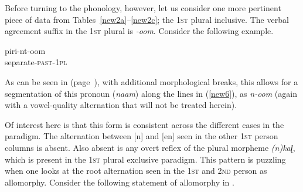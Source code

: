 \documentclass[output=paper]{langscibook}
\begin{document}
Before turning to the phonology, however, let us consider one more pertinent piece of data from Tables~\ref{new2a}--\ref{new2c}; the 1\textsc{st} plural inclusive. The verbal agreement suffix in the 1\textsc{st} plural is \textit{-oom}. Consider the following example.

\begin{exe}
\ex \label{new7}
\gll piri-nt-oom \\
separate-\textsc{past-1pl}   \\
\end{exe}

As can be seen in  (page~\pageref{new2a}),
with additional morphological breaks, this allows for a segmentation of this pronoun (\textit{naam}) along the lines in (\ref{new6}), as \textit{n-oom} (again with a vowel-quality alternation that will not be treated herein).


Of interest here is that this form is consistent across the different cases in the paradigm. The alternation between [n] and [en] seen in the other 1\textsc{st} person columns is absent. Also absent is any overt reflex of the plural morpheme \textit{(n)kaɭ}, which is present in the 1\textsc{st} plural exclusive paradigm. This pattern is puzzling when one looks at the root alternation seen in the 1\textsc{st} and 2\textsc{nd} person as allomorphy. Consider the following statement of allomorphy in \citet[306]{moskal2016towards}.\largerpage[-1]
\end{document}
